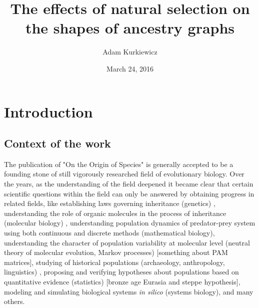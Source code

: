 \documentclass{l4proj}
\newif\ifdebug
\begin{document}
\title{The effects of natural selection on the shapes of ancestry graphs}
\author{Adam Kurkiewicz}
\date{March 24, 2016}
\maketitle

\begin{abstract}
\ifdebug
  Placeholder for the abstract, which will be written at the end.
\fi

\end{abstract}

\educationalconsent
%
%
\tableofcontents
\chapter{Introduction}
\label{intro}

\ifdebug
  Introduction. This should place the work in context and will be developed from the introduction produced for assessment.
\fi


\section{Context of the work}

The publication of "On the Origin of Species" is generally accepted to be a founding stone of still vigorously researched field of evolutionary biology. Over the years, as the understanding of the field deepened it became clear that certain scientific questions within the field can only be answered by obtaining progress in related fields, like establishing laws governing inheritance (genetics) \parencite{mendel}, understanding the role of organic molecules in the process of inheritance (molecular biology) \parencite{watson53}, understanding population dynamics of predator-prey system using both continuous and discrete methods (mathematical biology), understanding the character of population variability at molecular level (neutral theory of molecular evolution, Markov processes) \parencite{kimura68} [something about  PAM matrices], studying of historical populations (archaeology, anthropology, linguistics) \parencite{dubois}, proposing and verifying hypotheses about populations based on quantitative evidence (statistics) [bronze age Eurasia and steppe hypothesis], modeling and simulating biological systems \textit{in silico} (systems biology), and many others.
\end{document}

